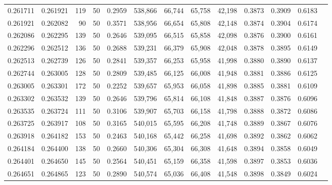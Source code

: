 \begin{tabular}{rrrrrrrrrrrrr}
0.261711 & 0.261921 &   119 &  50 &                                     0.2959 & 538,866 &  66,744 &  65,758 &  42,198 & 0.3873 & 0.3909 & 0.6183 \\
0.261921 & 0.262082 &    90 &  50 &                                     0.3571 & 538,956 &  66,654 &  65,808 &  42,148 & 0.3874 & 0.3904 & 0.6174 \\
0.262086 & 0.262295 &   139 &  50 &                                     0.2646 & 539,095 &  66,515 &  65,858 &  42,098 & 0.3876 & 0.3900 & 0.6161 \\
0.262296 & 0.262512 &   136 &  50 &                                     0.2688 & 539,231 &  66,379 &  65,908 &  42,048 & 0.3878 & 0.3895 & 0.6149 \\
0.262513 & 0.262739 &   126 &  50 &                                     0.2841 & 539,357 &  66,253 &  65,958 &  41,998 & 0.3880 & 0.3890 & 0.6137 \\
0.262744 & 0.263005 &   128 &  50 &                                     0.2809 & 539,485 &  66,125 &  66,008 &  41,948 & 0.3881 & 0.3886 & 0.6125 \\
0.263005 & 0.263301 &   172 &  50 &                                     0.2252 & 539,657 &  65,953 &  66,058 &  41,898 & 0.3885 & 0.3881 & 0.6109 \\
0.263302 & 0.263532 &   139 &  50 &                                     0.2646 & 539,796 &  65,814 &  66,108 &  41,848 & 0.3887 & 0.3876 & 0.6096 \\
0.263535 & 0.263724 &   111 &  50 &                                     0.3106 & 539,907 &  65,703 &  66,158 &  41,798 & 0.3888 & 0.3872 & 0.6086 \\
0.263725 & 0.263917 &   108 &  50 &                                     0.3165 & 540,015 &  65,595 &  66,208 &  41,748 & 0.3889 & 0.3867 & 0.6076 \\
0.263918 & 0.264182 &   153 &  50 &                                     0.2463 & 540,168 &  65,442 &  66,258 &  41,698 & 0.3892 & 0.3862 & 0.6062 \\
0.264184 & 0.264400 &   138 &  50 &                                     0.2660 & 540,306 &  65,304 &  66,308 &  41,648 & 0.3894 & 0.3858 & 0.6049 \\
0.264401 & 0.264650 &   145 &  50 &                                     0.2564 & 540,451 &  65,159 &  66,358 &  41,598 & 0.3897 & 0.3853 & 0.6036 \\
0.264651 & 0.264865 &   123 &  50 &                                     0.2890 & 540,574 &  65,036 &  66,408 &  41,548 & 0.3898 & 0.3849 & 0.6024 \\

\end{tabular}
